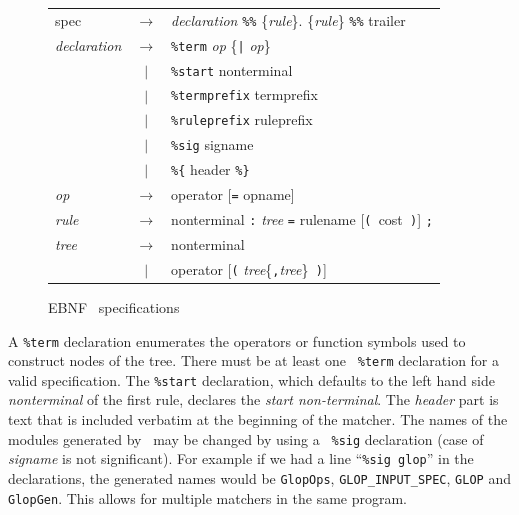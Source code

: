 \documentclass[11pt]{article}
\begin{document}
\begin{figure}[t]
\small
 \begin{center}
 \sl
 \begin{tabular}{lcl}
   spec	& $\rightarrow$ &  {\it declaration}
		   	   \verb.%%. \{{\it rule}\}
			   \verb.%%. trailer				\\[1ex]

   {\it declaration} 
	& $\rightarrow$ & {\tt \%term} {\it op} \{\verb.|. {\it op}\}	\\
    	& $\mid$	& {\tt \%start} nonterminal			\\
	& $\mid$	& {\tt \%termprefix} termprefix			\\
	& $\mid$	& {\tt \%ruleprefix} ruleprefix			\\
	& $\mid$	& {\tt \%sig} signame				\\
	& $\mid$	& \verb.%{. header \verb.%}.			\\[1ex]

   {\it op}
	& $\rightarrow$ & operator {\rm [}{\tt =} opname{\rm ]}		\\[1ex]

   {\it rule}
	& $\rightarrow$ & nonterminal \verb.:. {\it tree} \verb.=. 
			  rulename {\rm [}{\tt (~}cost{\tt ~)}{\rm ]} 
			  \verb.;.					\\[1ex]

   {\it tree}
	& $\rightarrow$ & nonterminal					\\[1ex]
	& $\mid$	& operator {\rm [}{\tt (}
			  {\it tree}\{\verb.,.{\it tree}\}{\tt ~)}{\rm ]}
 \end{tabular}
 \end{center}
\caption{EBNF \mlburg\ specifications}

\label{f:specification}
\end{figure}

A {\tt \%term} declaration enumerates the operators or function symbols
used to construct nodes of the tree.  There must be at least one {\tt
\%term} declaration for a valid specification.  The {\tt \%start}
declaration, which defaults to the left hand side {\sl nonterminal} of the
first rule, declares the {\em start non-terminal}. The {\sl header} part is
text that is included verbatim at the beginning of the matcher.  The names
of the modules generated by \mlburg\ may be changed by using a {\tt
\%sig} declaration (case of {\sl signame} is not significant).  For example
if we had a line ``\verb.%sig glop.'' in the declarations, the generated
names would be {\tt GlopOps}, {\tt GLOP\_INPUT\_SPEC}, {\tt GLOP} and {\tt
GlopGen}.  This allows for multiple matchers in the same program.
\end{document}
